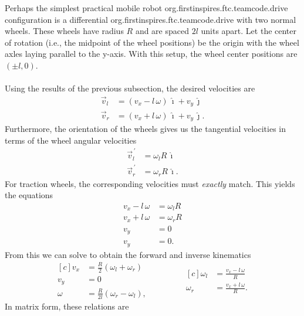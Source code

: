 \documentclass{article}
\newcommand{\pvec}[1]{\vec{#1}^{\,\prime}}
\begin{document}
Perhaps the simplest practical mobile robot org.firstinspires.ftc.teamcode.drive configuration is a differential org.firstinspires.ftc.teamcode.drive with two normal wheels. These wheels have radius $R$ and are spaced $2l$ units apart. Let the center of rotation (i.e., the midpoint of the wheel positions) be the origin with the wheel axles laying parallel to the y-axis. With this setup, the wheel center positions are \((\pm l, 0)\).\\
\\
Using the results of the previous subsection, the desired velocities are
\begin{align*}
    \vec{v}_l &= (v_x - l \, \omega) \, \hat{\imath} + v_y \, \hat{\jmath}\\
    \vec{v}_r &= (v_x + l \, \omega) \, \hat{\imath} + v_y \, \hat{\jmath}.
\end{align*}
Furthermore, the orientation of the wheels gives us the tangential velocities in terms of the wheel angular velocities
\begin{align*}
    \pvec{v}_l &= \omega_l R \, \hat{\imath}\\
    \pvec{v}_r &= \omega_r R \, \hat{\imath}.
\end{align*}
For traction wheels, the corresponding velocities must \textit{exactly} match. This yields the equations
\begin{align*}
    v_x - l \, \omega &= \omega_l R \\
    v_x + l \, \omega &= \omega_r R \\
    v_y &= 0 \\
    v_y &= 0.
\end{align*}
From this we can solve to obtain the forward and inverse kinematics
\begin{equation*}
    \begin{aligned}[c]
        v_x &= \frac{R}{2}(\omega_l + \omega_r) \\
        v_y &= 0 \\
        \omega &= \frac{R}{2l}(\omega_r - \omega_l),
    \end{aligned}
    \qquad\qquad
    \begin{aligned}[c]
        \omega_l &= \frac{v_x - l \, \omega}{R} \\
        \omega_r &= \frac{v_x + l \, \omega}{R}.
    \end{aligned}
\end{equation*}
In matrix form, these relations are
\end{document}
